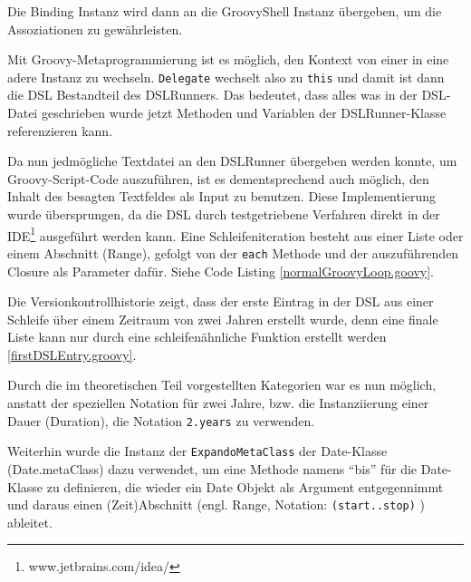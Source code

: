 \documentclass[11pt,english,ngerman, headsepline]{scrreprt}
\begin{document}
 Die Binding Instanz wird dann an die GroovyShell
Instanz übergeben, um die Assoziationen zu gewährleisten.

Mit Groovy-Metaprogrammierung ist es möglich, den Kontext von einer in eine adere Instanz zu
wechseln. \texttt{Delegate} wechselt also zu
\texttt{this} und damit ist dann die DSL Bestandteil des DSLRunners. Das
bedeutet, dass alles was in der DSL-Datei geschrieben wurde jetzt Methoden und
Variablen der DSLRunner-Klasse referenzieren kann.
 


Da nun jedmögliche Textdatei an den DSLRunner übergeben werden konnte, um
Groovy-Script-Code auszuführen, ist es dementsprechend auch möglich, den Inhalt
des besagten Textfeldes als Input zu benutzen. Diese Implementierung
wurde übersprungen, da die DSL durch testgetriebene Verfahren
\cite{beck2002driven} direkt in der IDE\footnote{www.jetbrains.com/idea/ }
ausgeführt werden kann.
 Eine Schleifeniteration besteht aus einer Liste oder
einem Abschnitt (Range), gefolgt von der \texttt{each} Methode und der
auszuführenden Closure als Parameter dafür. Siehe Code Listing \ref{normalGroovyLoop.goovy}. 



Die Versionkontrollhistorie zeigt, dass der erste Eintrag in der DSL aus einer
Schleife über einem Zeitraum von zwei Jahren erstellt wurde, denn eine finale
Liste kann nur durch eine schleifenähnliche Funktion erstellt werden
\ref{firstDSLEntry.groovy}.



Durch die im theoretischen Teil vorgestellten Kategorien war es nun möglich,
anstatt der speziellen Notation für zwei Jahre, bzw. die Instanziierung einer
Dauer (Duration), die Notation \texttt{2.years} zu verwenden. 

Weiterhin wurde die Instanz
der \texttt{ExpandoMetaClass} der Date-Klasse (Date.metaClass) dazu verwendet,
um eine Methode namens ``bis'' für die Date-Klasse zu definieren, die wieder ein Date
Objekt als Argument entgegennimmt und daraus einen (Zeit)Abschnitt (engl.
Range, Notation: \texttt{(start..stop)}  ) ableitet.
\end{document}
